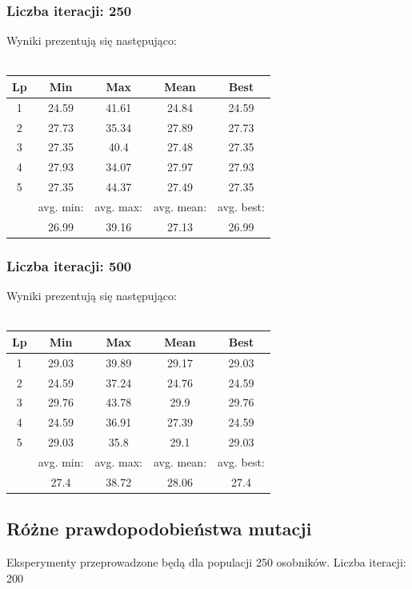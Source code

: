 \documentclass[a4paper,11pt]{article}
\begin{document}
				\subsubsection{Liczba iteracji: 250}
					Wyniki prezentują się następująco:\\~\\
					\begin{tabular}{|c|c|c|c|c|}
						\hline 
						Lp & Min & Max & Mean & Best \\
						\hline
						1 & 24.59 & 41.61 & 24.84 & 24.59 \\\hline
						2 & 27.73 & 35.34 & 27.89 & 27.73 \\\hline
						3 & 27.35 & 40.4 & 27.48 & 27.35 \\\hline
						4 & 27.93 & 34.07 & 27.97 & 27.93 \\\hline
						5 & 27.35 & 44.37 & 27.49 & 27.35 \\\hline
						&avg. min:&avg. max:&avg. mean:&avg. best:\\\hline
						& 26.99 & 39.16 & 27.13 & 26.99 \\\hline
					\end{tabular} 
				\subsubsection{Liczba iteracji: 500}
					Wyniki prezentują się następująco:\\~\\
					\begin{tabular}{|c|c|c|c|c|}
						\hline 
						Lp & Min & Max & Mean & Best \\
						\hline
						1 & 29.03 & 39.89 & 29.17 & 29.03 \\\hline
						2 & 24.59 & 37.24 & 24.76 & 24.59 \\\hline
						3 & 29.76 & 43.78 & 29.9 & 29.76 \\\hline
						4 & 24.59 & 36.91 & 27.39 & 24.59 \\\hline
						5 & 29.03 & 35.8 & 29.1 & 29.03 \\\hline
						&avg. min:&avg. max:&avg. mean:&avg. best:\\\hline
						& 27.4 & 38.72 & 28.06 & 27.4 \\\hline
					\end{tabular} 
			\subsection{Różne prawdopodobieństwa mutacji}
				Eksperymenty przeprowadzone będą dla populacji 250 osobników. Liczba iteracji: 200
\end{document}
